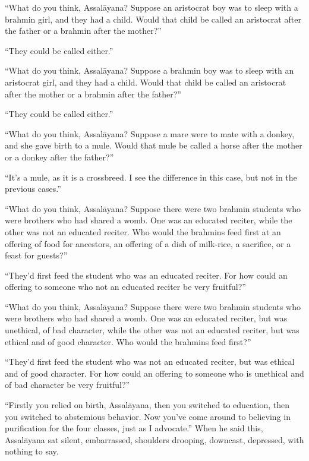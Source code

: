 \documentclass[12pt,openany]{book}%
\begin{document}
“What do you think, \textsanskrit{Assalāyana}? Suppose an aristocrat boy was to sleep with a brahmin girl, and they had a child. Would that child be called an aristocrat after the father or a brahmin after the mother?” 

“They could be called either.” 

“What do you think, \textsanskrit{Assalāyana}? Suppose a brahmin boy was to sleep with an aristocrat girl, and they had a child. Would that child be called an aristocrat after the mother or a brahmin after the father?” 

“They could be called either.” 

“What do you think, \textsanskrit{Assalāyana}? Suppose a mare were to mate with a donkey, and she gave birth to a mule. Would that mule be called a horse after the mother or a donkey after the father?” 

“It’s a mule, as it is a crossbreed. I see the difference in this case, but not in the previous cases.” 

“What do you think, \textsanskrit{Assalāyana}? Suppose there were two brahmin students who were brothers who had shared a womb. One was an educated reciter, while the other was not an educated reciter. Who would the brahmins feed first at an offering of food for ancestors, an offering of a dish of milk-rice, a sacrifice, or a feast for guests?” 

“They’d first feed the student who was an educated reciter. For how could an offering to someone who not an educated reciter be very fruitful?” 

“What do you think, \textsanskrit{Assalāyana}? Suppose there were two brahmin students who were brothers who had shared a womb. One was an educated reciter, but was unethical, of bad character, while the other was not an educated reciter, but was ethical and of good character. Who would the brahmins feed first?” 

“They’d first feed the student who was not an educated reciter, but was ethical and of good character. For how could an offering to someone who is unethical and of bad character be very fruitful?” 

“Firstly you relied on birth, \textsanskrit{Assalāyana}, then you switched to education, then you switched to abstemious behavior. Now you’ve come around to believing in purification for the four classes, just as I advocate.” When he said this, \textsanskrit{Assalāyana} sat silent, embarrassed, shoulders drooping, downcast, depressed, with nothing to say. 
\end{document}
